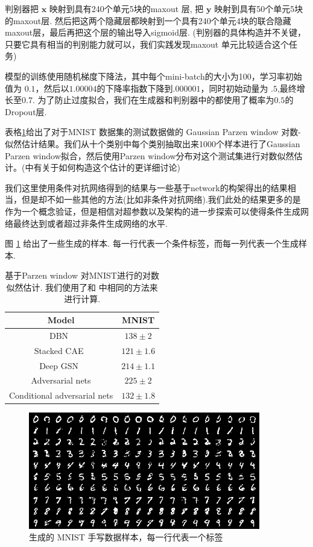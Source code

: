 \documentclass{article} %
\begin{document}
判别器把 ${\bm{x}}$ 映射到具有240个单元5块的maxout \cite{Goodfellow_maxout_2013} 层, 把 ${\bm{y}}$ 映射到具有50个单元5块的maxout层. 然后把这两个隐藏层都映射到一个具有240个单元4块的联合隐藏maxout层，最后再把这个层的输出导入sigmoid层. (判别器的具体构造并不关键，只要它具有相当的判别能力就可以，我们实践发现maxout 单元比较适合这个任务)

模型的训练使用随机梯度下降法，其中每个mini-batch的大小为100，学习率初始值为 $0.1$，然后以$1.00004$的下降率指数下降到$.000001$，同时初始动量为 $.5$,最终增长至$0.7$. 为了防止过度拟合，我们在生成器和判别器中的都使用了概率为$0.5$的Dropout层\cite{Hinton-et-al-arxiv2012}.

表格\ref{table:parzen}给出了对于MNIST 数据集的测试数据做的 Gaussian Parzen window 对数-似然估计结果。我们从十个类别中每个类别抽取出来1000个样本进行了Gaussian Parzen window拟合，然后使用Parzen window分布对这个测试集进行对数似然估计。(\cite{Goodfellow-et-al-NIPS2014-small}中有关于如何构造这个估计的更详细讨论)

我们这里使用条件对抗网络得到的结果与一些基于network的构架得出的结果相当，但是却不如一些其他的方法(比如非条件对抗网络).我们此处的结果更多的是作为一个概念验证，但是相信对超参数以及架构的进一步探索可以使得条件生成网络最终达到或者超过非条件生成网络的水平.

图 \ref{fig:mnist} 给出了一些生成的样本. 每一行代表一个条件标签，而每一列代表一个生成样本.

\begin{table}
	\centering
	\begin{tabular}{c|c}
	Model & MNIST  \\
	\hline
	DBN~\citep{Bengio-et-al-ICML2013} & $138 \pm 2$  \\
	Stacked CAE~\citep{Bengio-et-al-ICML2013} & $121 \pm 1.6$ \\
	Deep GSN~\citep{Bengio-et-al-ICML-2014} & $214 \pm 1.1$ \\
	Adversarial nets & $225 \pm 2$ \\
	Conditional adversarial nets & $132 \pm 1.8$
	\end{tabular}
	\caption{\small
	基于Parzen window 对MNIST进行的对数似然估计. 我们使用了和
	\cite{Goodfellow-et-al-NIPS2014-small} 中相同的方法来进行计算.}
	\label{table:parzen}
\end{table}



\begin{figure}[h]
	\centering
	    \includegraphics[width=0.9\textwidth]{mnist.png}
	    \caption{\small 生成的 MNIST 手写数据样本，每一行代表一个标签}
	\label{fig:mnist}
\end{figure}
\end{document}
